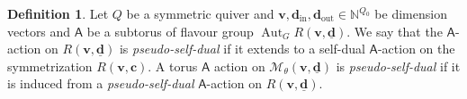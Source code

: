 \documentclass[10pt]{amsart}
\theoremstyle{definition}
\newtheorem{Definition}[Theorem]{Definition}
\numberwithin{equation}{section}
\newcommand{\bC}{\mathbb{C}}
\newcommand{\bN}{\mathbb{N}}
\newcommand{\bv}{\mathbf{v}}
\newcommand{\bd}{\mathbf{d}}
\newcommand{\cM}{\mathcal{M}}
\newcommand{\sA}{\mathsf{A}}
\newcommand{\Aut}{\operatorname{Aut}}
\newcommand{\pt}{\operatorname{pt}}
\newcommand{\In}{\operatorname{in}}
\newcommand{\Out}{\operatorname{out}}
\begin{document}
\begin{Definition}\label{def pseudo-self-dual}
Let $Q$ be a symmetric quiver and $\bv,\bd_{\In},\bd_{\Out}\in \bN^{Q_0}$ be dimension vectors and $\sA$ be a subtorus of flavour group $\Aut_G R(\bv,\underline{\bd})$. We say that the $\sA$-action on $R(\bv,\underline{\bd})$ is \textit{pseudo-self-dual} if it extends to a self-dual $\sA$-action on the symmetrization $R(\bv,\mathbf c)$. 
A torus $\sA$ action on $\cM_\theta(\bv,\underline{\bd})$ is \textit{pseudo-self-dual} if it is induced from a \textit{pseudo-self-dual} $\sA$-action on $R(\bv,\underline{\bd})$.
\end{Definition}
\end{document}
